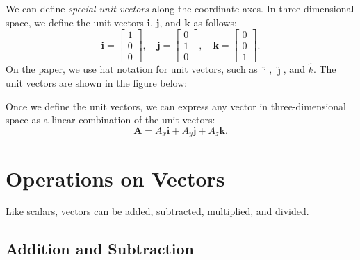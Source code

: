 \documentclass[12pt]{article}
\begin{document}
We can define \emph{special unit vectors} along the coordinate axes. In three-dimensional space, we define the unit vectors $\mathbf{i}$, $\mathbf{j}$, and $\mathbf{k}$ as follows:
\[
\mathbf{i} = \begin{bmatrix} 1 \\ 0 \\ 0 \end{bmatrix}, \quad
\mathbf{j} = \begin{bmatrix} 0 \\ 1 \\ 0 \end{bmatrix}, \quad
\mathbf{k} = \begin{bmatrix} 0 \\ 0 \\ 1 \end{bmatrix}.
\] 
On the paper, we use hat notation for unit vectors, such as \(\hat{\imath}\), \(\hat{\jmath}\), and \(\hat{k}\). The unit vectors are shown in the figure below:
\begin{figure}[h]
\centering
{}
\end{figure}

Once we define the unit vectors, we can express any vector in three-dimensional space as a linear combination of the unit vectors:
\[
\mathbf{A} = A_x \mathbf{i} + A_y \mathbf{j} + A_z \mathbf{k}.
\]





\section{Operations on Vectors}
Like scalars, vectors can be added, subtracted, multiplied, and divided.
\subsection{Addition and Subtraction}
\end{document}
